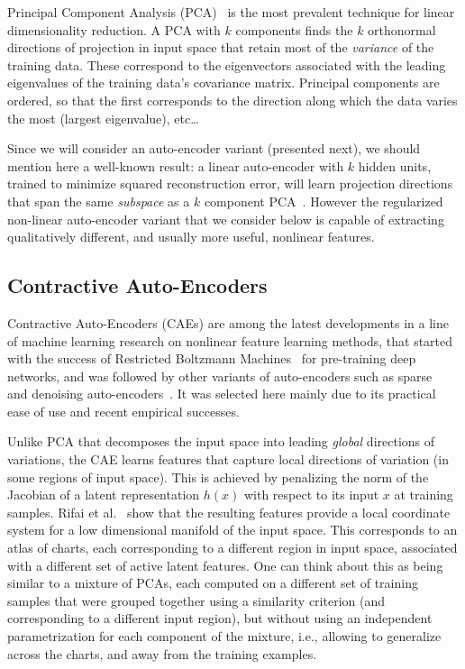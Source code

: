 \documentclass[runningheads,a4paper]{llncs}
\begin{document}
Principal Component Analysis (PCA)~\citep{Pearson-1901,Hotelling1933} 
is the most prevalent technique for
linear dimensionality reduction. A PCA with $k$ components finds the $k$
orthonormal directions of projection in input space that retain most of the
\textit{variance} of the training data. These correspond to the eigenvectors
associated with the leading eigenvalues of the training data's covariance
matrix. Principal components are
ordered, so that the first corresponds to the direction along which the data varies the
most (largest eigenvalue), etc\ldots 

Since we will consider an auto-encoder variant (presented next),
we should mention here a well-known result: a linear auto-encoder with $k$
hidden units, trained to minimize squared reconstruction error, will learn
projection directions that span the same \textit{subspace} as a $k$ component
PCA~\citep{Baldi89}.  However the regularized non-linear auto-encoder variant
that we consider below is capable of extracting qualitatively different, and
usually more useful, nonlinear features.

\subsection{Contractive Auto-Encoders}

Contractive Auto-Encoders (CAEs) \citep{Rifai+al-2011} are among
the latest developments in a line of machine learning research on nonlinear
feature learning methods, that started with the success of Restricted Boltzmann
Machines~\citep{Hinton06} for pre-training deep networks, and was followed by
other variants of auto-encoders such as
sparse~\citep{ranzato-07-small,Koray-08,Goodfellow2009} and  denoising
auto-encoders~\citep{VincentPLarochelleH2008}.
It was selected here mainly due to its practical ease of use and recent
empirical successes.

Unlike PCA that decomposes the input space into leading {\em global} directions
of variations, the CAE learns features that capture local directions of
variation (in some regions of input space). This is achieved by penalizing the
norm of the Jacobian of a latent representation $h(x)$ with respect to its
input $x$ at training samples. Rifai et al.~\citep{Rifai+al-2011} show that the
resulting features provide a local coordinate system for a low dimensional
manifold of the input space. This corresponds to an atlas of charts, each
corresponding to a different region in input space, associated with a different
set of active latent features. One can think about this as being similar to a
mixture of PCAs, each computed on a different set of training samples that were
grouped together using a similarity criterion (and corresponding to a different
input region), but without using an independent parametrization for each
component of the mixture, i.e., allowing to generalize across the charts, and
away from the training examples.
\end{document}
